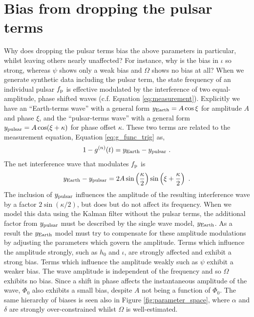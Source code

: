 \documentclass[fleqn,usenatbib,useAMS]{mnras}
\begin{document}
\section{Bias from dropping the pulsar terms}\label{sec:bias_appendix}
Why does dropping the pulsar terms bias the above parameters in particular, whilst leaving others nearly unaffected? For instance, why is the bias in $\iota$ so strong, whereas $\psi$ shows only a weak bias and  $\Omega$ shows no bias at all? When we generate synthetic data including the pulsar term, the state frequency of an individual pulsar $f_{\rm p}$ is effective modulated by the interference of two equal-amplitude, phase shifted waves (c.f. Equation \eqref{eq:measurement}). Explicitly we have an 
``Earth-terms wave'' with a general form $y_{\rm Earth} = A \cos \xi$ for amplitude $A$ and phase $\xi$, and the ``pulsar-terms wave'' with a general form $y_{\rm pulsar} = A \cos (\xi + \kappa)$ for phase offset $\kappa$. These two terms are related to the measurement equation, Equation \eqref{eq:g_func_trig} as,
\begin{eqnarray}
	1 - g^{(n)}(t) =  y_{\rm Earth}  - y_{\rm pulsar} \ .
\end{eqnarray}
The net interference wave that modulates $f_{\rm p}$ is 
\begin{eqnarray}
	y_{\rm Earth} - y_{\rm pulsar} = 2 A \sin \left(\frac{\kappa}{2}\right) \sin \left(\xi + \frac{\kappa}{2}\right) \ .
\end{eqnarray}
The inclusion of  $y_{\rm pulsar}$ influences the amplitude of the resulting interference wave by a factor $ 2 \sin (\kappa/2)$, but does but do not affect its frequency. When we model this data using the Kalman filter without the pulsar terms, the additional factor from $y_{\rm pulsar}$ must be described by the single wave model, $y_{\rm Earth}$. As a result the $y_{\rm Earth}$ model must try to compensate for these amplitude modulations by adjusting the parameters which govern the amplitude. Terms which influence the amplitude strongly, such as $h_0$ and $\iota$, are strongly affected and exhibit a strong bias. Terms which influence the amplitude weakly such as $\psi$ exhibit a weaker bias. The wave amplitude is independent of the frequency and so $\Omega$ exhibits no bias. Since a shift in phase affects the instantaneous amplitude of the wave, $\Phi_0$ also exhibits a small bias, despite $A$ not being a function of $\Phi_0$. The same hierarchy of biases is seen also in Figure \ref{fig:parameter_space}, where $\alpha$ and $\delta$ are strongly over-constrained whilst $\Omega$ is well-estimated. \newline  
\end{document}
